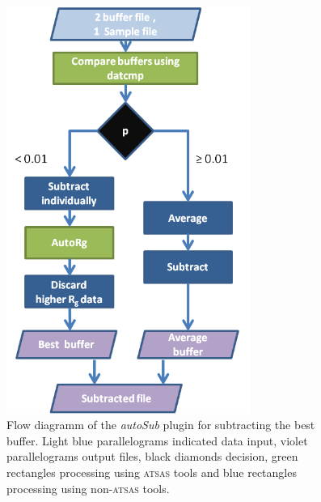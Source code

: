 \documentclass[preprint,pdf]{iucr}              %
\begin{document}
\begin{figure}
\centering
\includegraphics[width=8cm]{autosub.png}%
\caption{Flow diagramm of the \textit{autoSub} plugin for subtracting the best buffer. Light blue parallelograms indicated data input, violet  parallelograms output files, black diamonds decision, green rectangles processing using \textsc{atsas} tools and blue rectangles processing using non-\textsc{atsas} tools. }
\label{fgr:autosub}
\end{figure}
\end{document}
